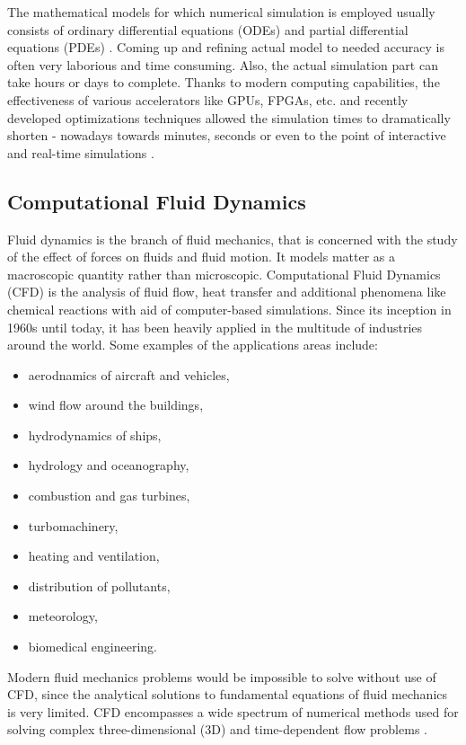 The mathematical models for which numerical simulation is employed usually consists of ordinary differential equations (ODEs) and partial differential equations (PDEs) \citep{yangEngineeringMathematicsExamples2017}. Coming up and refining actual model to needed accuracy is often very laborious and time consuming. Also, the actual simulation part can take hours or days to complete. Thanks to modern computing capabilities, the effectiveness of various accelerators like GPUs, FPGAs, etc. and recently developed optimizations techniques allowed the simulation times to dramatically shorten - nowadays towards minutes, seconds or even to the point of interactive and real-time simulations \citep{harwoodREALTIMEMODELLINGSIMULATION}.


\subsection{Computational Fluid Dynamics}\label{sec:cfd}
Fluid dynamics is the branch of fluid mechanics, that is concerned with the study of the effect of forces on fluids and fluid motion. It models matter as a macroscopic quantity rather than microscopic. Computational Fluid Dynamics (CFD) is the analysis of fluid flow, heat transfer and additional phenomena like chemical reactions with aid of computer-based simulations. Since its inception in 1960s until today, it has been heavily applied in the multitude of industries around the world. Some examples of the applications areas include:

\begin{itemize}
	\item aerodnamics of aircraft and vehicles,
	\item wind flow around the buildings,
	\item hydrodynamics of ships,
	\item hydrology and oceanography,
	\item combustion and gas turbines,
	\item turbomachinery,
	\item heating and ventilation,
	\item distribution of pollutants,
	\item meteorology,
	\item biomedical engineering.
\end{itemize}

Modern fluid mechanics problems would be impossible to solve without use of CFD, since the analytical solutions to fundamental equations of fluid mechanics is very limited. CFD encompasses a wide spectrum of numerical methods used for solving complex three-dimensional (3D) and time-dependent flow problems \citep{rapp2017}. 

